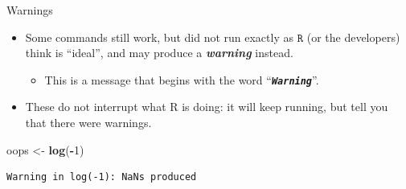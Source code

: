 \documentclass[
  11pt,
  ignorenonframetext,
]{beamer}
\newcommand{\VERB}{\Verb[commandchars=\\\{\}]}
\newenvironment{Shaded}{\begin{snugshade}}{\end{snugshade}}
\newcommand{\DecValTok}[1]{\textcolor[rgb]{0.00,0.00,0.81}{#1}}
\newcommand{\FunctionTok}[1]{\textcolor[rgb]{0.13,0.29,0.53}{\textbf{#1}}}
\newcommand{\NormalTok}[1]{#1}
\newcommand{\OtherTok}[1]{\textcolor[rgb]{0.56,0.35,0.01}{#1}}
\newcommand{\SpecialCharTok}[1]{\textcolor[rgb]{0.81,0.36,0.00}{\textbf{#1}}}
\newcommand{\WarningTok}[1]{\textcolor[rgb]{0.56,0.35,0.01}{\textbf{\textit{#1}}}}
\providecommand{\tightlist}{%
  \setlength{\itemsep}{0pt}\setlength{\parskip}{0pt}}
\newcommand{\R}{\texttt{R}}
\newcommand{\important}[1]{\textcolor{darkred}{#1}}
\begin{document}
\begin{frame}[fragile]{Warnings}
\protect\hypertarget{warnings}{}
\begin{itemize}
\tightlist
\item
  Some commands still work, but did not run exactly as \(\R\) (or the
  developers) think is ``ideal'', and may produce a
  \textbf{\emph{warning}} instead.

  \begin{itemize}
  \tightlist
  \item
    This is a message that begins with the word
    ``\WarningTok{\texttt{Warning}}''.
  \end{itemize}
\item
  These do not interrupt what R is doing: it will keep running, but tell
  you that there were warnings.

\end{itemize}

\begin{Shaded}
\begin{Highlighting}[]
\NormalTok{oops }\OtherTok{\textless{}{-}} \FunctionTok{log}\NormalTok{(}\SpecialCharTok{{-}}\DecValTok{1}\NormalTok{)}
\end{Highlighting}
\end{Shaded}

\begin{verbatim}
Warning in log(-1): NaNs produced
\end{verbatim}
\end{frame}
\end{document}
